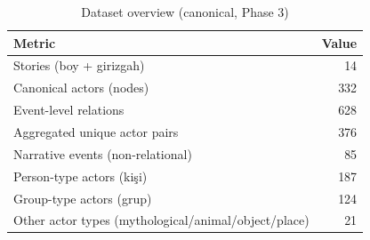\begin{table}
\caption{Dataset overview (canonical, Phase 3)}
\label{tab:t01_dataset_overview}
\begin{tabular}{lr}
\toprule
Metric & Value \\
\midrule
Stories (boy + girizgah) & 14 \\
Canonical actors (nodes) & 332 \\
Event-level relations & 628 \\
Aggregated unique actor pairs & 376 \\
Narrative events (non-relational) & 85 \\
Person-type actors (kişi) & 187 \\
Group-type actors (grup) & 124 \\
Other actor types (mythological/animal/object/place) & 21 \\
\bottomrule
\end{tabular}
\end{table}
